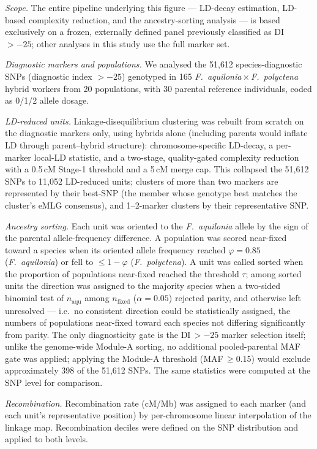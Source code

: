 \documentclass[11pt]{article}
\newcommand{\Faq}{\textit{F.~aquilonia}}
\newcommand{\Fpo}{\textit{F.~polyctena}}
\begin{document}
{%
\emph{Scope.} The entire pipeline underlying this figure --- LD-decay estimation, LD-based
complexity reduction, and the ancestry-sorting analysis --- is based exclusively on a frozen,
externally defined panel previously classified as DI $>-25$; other analyses in this study use
the full marker set.

\emph{Diagnostic markers and populations.} We analysed the 51{,}612 species-diagnostic
SNPs (diagnostic index $>-25$) genotyped in 165 \Faq{}\,$\times$\,\Fpo{} hybrid workers
from 20 populations, with 30 parental reference individuals, coded as 0/1/2 allele dosage.

\emph{LD-reduced units.} Linkage-disequilibrium clustering was rebuilt from scratch on the
diagnostic markers only, using hybrids alone (including parents would inflate LD through
parent--hybrid structure): chromosome-specific LD-decay, a per-marker local-LD statistic,
and a two-stage, quality-gated complexity reduction with a 0.5\,cM Stage-1 threshold and a
5\,cM merge cap. This collapsed the 51{,}612 SNPs to 11{,}052 LD-reduced units; clusters of
more than two markers are represented by their best-SNP (the member whose genotype best matches
the cluster's eMLG consensus), and 1--2-marker clusters by their representative SNP.

\emph{Ancestry sorting.} Each unit was oriented to the \Faq{} allele by the sign of the
parental allele-frequency difference. A population was scored near-fixed toward a species
when its oriented allele frequency reached $\varphi=0.85$ (\Faq{}) or fell to $\le 1-\varphi$
(\Fpo{}). A unit was called sorted when the proportion of populations near-fixed reached the
threshold $\tau$; among sorted units the direction was assigned to the majority species when
a two-sided binomial test of $n_{\text{aqu}}$ among $n_{\text{fixed}}$ ($\alpha=0.05$)
rejected parity, and otherwise left unresolved --- i.e.\ no consistent direction could be
statistically assigned, the numbers of populations near-fixed toward each species not differing
significantly from parity. The only diagnosticity gate is the
DI\,$>-25$ marker selection itself; unlike the genome-wide Module-A sorting, no additional
pooled-parental MAF gate was applied; applying the Module-A threshold (MAF\,$\ge 0.15$) would
exclude approximately 398 of the 51{,}612 SNPs. The same statistics were computed at the SNP
level for comparison.

\emph{Recombination.} Recombination rate (cM/Mb) was assigned to each marker (and each
unit's representative position) by per-chromosome linear interpolation of the linkage map.
Recombination deciles were defined on the SNP distribution and applied to both levels.

}
\end{document}
